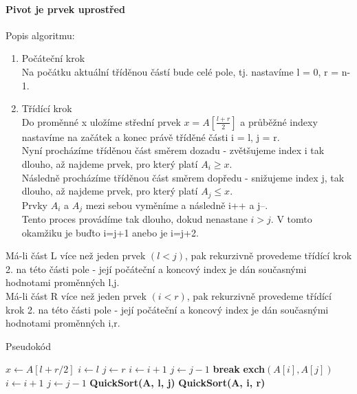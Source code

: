 \documentclass[10pt,a4paper]{article}
\begin{document}
\paragraph{Pivot je prvek uprostřed} Popis algoritmu: \\
\begin{enumerate}
	\item Počáteční krok \\
	Na počátku aktuální tříděnou částí bude celé pole, tj. nastavíme l = 0, r = n-1.
	\item Třídící krok \\
	Do proměnné x uložíme střední prvek $x = A [ \frac{l+r}{2} ]$ a průběžné indexy nastavíme na začátek a konec právě tříděné části i = l, j = r. \\
	Nyní procházíme tříděnou část směrem dozadu - zvětšujeme index i tak dlouho, až najdeme prvek, pro který platí $A_i \geq x$. \\
	Následně procházíme tříděnou část směrem dopředu - snižujeme index j, tak dlouho, až najdeme prvek, pro který platí $A_j \leq x$. \\
	Prvky $A_i$ a $A_j$ mezi sebou vyměníme a následně i++ a j--. \\
	Tento proces provádíme tak dlouho, dokud nenastane $i>j$. V tomto okamžiku je buďto i=j+1 anebo je i=j+2.
\end{enumerate}
Má-li část L více než jeden prvek $(l<j)$, pak rekurzivně provedeme třídící krok 2. na této části pole - její počáteční a koncový index je dán současnými hodnotami proměnných l,j. \\
Má-li část R více než jeden prvek $(i<r)$, pak rekurzivně provedeme třídící krok 2. na této části pole - její počáteční a koncový index je dán současnými hodnotami proměnných i,r. \\
\begin{algorithm}
\caption{Pseudokód}
\begin{algorithmic}[]
\State $ x \gets A[l+r/2] $
\State $ i \gets l $
\State $ j \gets r $
\Do
		\State $i \gets i + 1$
	\EndWhile
		\State $j \gets j - 1$
	\EndWhile
		\State \textbf{break}
	\EndIf
	\State \textbf{exch}$(A[i], A[j])$
	\State $i \gets i + 1$
	\State $j \gets j - 1$
	\State \textbf{QuickSort(A, l, j)}
\EndIf
{}
	\State \textbf{QuickSort(A, i, r)}
\EndIf
\EndProcedure
\end{algorithmic}
\end{algorithm}
\newpage
\end{document}
